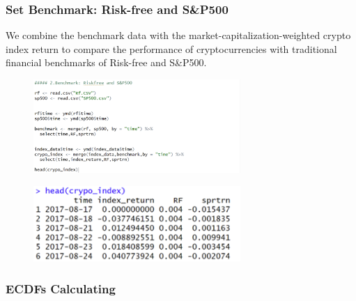 \documentclass{article}
\begin{document}
\hypertarget{Set Benchmark: Risk-free and S\&P500}{%
\subsubsection{Set Benchmark: Risk-free and S\&P500}\label{Set Benchmark: Risk-free and S\&P500}}
We combine the benchmark data with the market-capitalization-weighted crypto index return to compare the performance of cryptocurrencies with traditional financial benchmarks of Risk-free and S\&P500.
\begin{figure}[h]
    \centering
    \includegraphics[width=0.7\textwidth]{6.png}
    \label{fig:example}
\end{figure}
\begin{figure}[h]
    \centering
    \includegraphics[width=0.7\textwidth]{7.png}
    \label{fig:example}
\end{figure}


\hypertarget{ECDFs Calculating}{%
\subsubsection{ECDFs Calculating}\label{ECDFs Calculating}}
\end{document}
